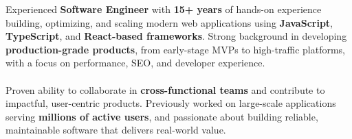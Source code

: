 
\begin{minipage}[t]{0.5\textwidth}
    \vspace{-6pt}

    Experienced \textbf{Software Engineer} with \textbf{15+ years} of hands-on experience building, optimizing, and scaling modern web applications using \textbf{JavaScript}, \textbf{TypeScript}, and \textbf{React-based frameworks}. Strong background in developing \textbf{production-grade products}, from early-stage MVPs to high-traffic platforms, with a focus on performance, SEO, and developer experience.
    \\
    \\
    Proven ability to collaborate in \textbf{cross-functional teams} and contribute to impactful, user-centric products. Previously worked on large-scale applications serving \textbf{millions of active users}, and passionate about building reliable, maintainable software that delivers real-world value.

\end{minipage}
\hfill %

